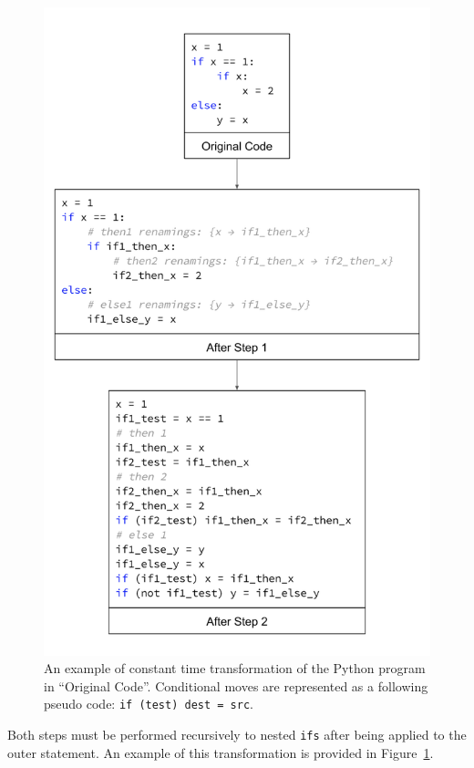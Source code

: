 \documentclass[sigplan, review]{acmart}
\begin{document}
\begin{figure}[bhp]
\includegraphics[width=\columnwidth]{cmov_if_transofrmation.png}
\caption{An example of constant time transformation of the Python program in ``Original Code''. Conditional moves are represented as a following pseudo code: \texttt{if (test) dest = src}.}
\label{fig:cmov_if_transofrmation}
\end{figure}

Both steps must be performed recursively to nested \texttt{ifs} after being applied to the outer statement. An example of this transformation is provided in Figure~\ref{fig:cmov_if_transofrmation}.
\end{document}
